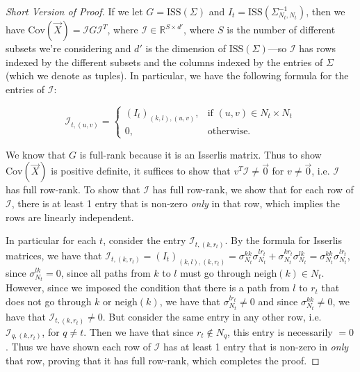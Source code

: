 \documentclass{article}
\theoremstyle{definition}
\newcommand{\ISS}{\text{ISS}}
\newcommand{\Cov}{\mathrm{Cov}}
\newcommand{\X}{\vec{X}}
\newcommand{\neigh}[1]{\text{neigh}(#1)}
\newcommand{\I}{\mathcal{I}}
\begin{document}
\begin{proof}[Short Version of Proof]
If we let $G = \ISS(\Sigma)$ and $I_t = \ISS(\Sigma_{N_t, N_t}^{-1})$, then we have $\Cov(\X) = \I G \I^T$, where $\I \in \mathbb{R}^{S \times d'}$, where $S$ is the number of different subsets we're considering and $d'$ is the dimension of $\ISS(\Sigma)$---so $\I$ has rows indexed by the different subsets and the columns indexed by the entries of $\Sigma$ (which we denote as tuples). In particular, we have the following formula for the entries of $\I$:

\begin{equation}
\I_{t, (u,v)} =
\begin{cases}
    (I_t)_{(k,l), (u,v)},& \text{if } (u,v) \in N_t \times N_t \\
    0,              & \text{otherwise.}
\end{cases}
\end{equation}


We know that $G$ is full-rank because it is an Isserlis matrix. Thus to show $\Cov(\X)$ is positive definite, it suffices to show that $v^T \I \neq \vec{0}$ for $v \neq \vec{0}$, i.e. $\I$ has full row-rank. To show that $\I$ has full row-rank, we show that for each row of $\I$, there is at least 1 entry that is non-zero \emph{only} in that row, which implies the rows are linearly independent. 

In particular for each $t$, consider the entry $\I_{t, (k, r_t)}$. By the formula for Isserlis matrices, we have that $\I_{t, (k,r_t)} = (I_t)_{(k,l), (k, r_t)} = \sigma_{N_t}^{kk}\sigma_{N_t}^{lr_t} + \sigma_{N_t}^{kr_t}\sigma_{N_t}^{lk} = \sigma_{N_t}^{kk}\sigma_{N_t}^{lr_t}$, since $\sigma_{N_t}^{lk} = 0$, since all paths from $k$ to $l$ must go through $\neigh{k} \in N_t$. However, since we imposed the condition that there is a path from $l$ to $r_t$ that does not go through $k$ or $\neigh{k}$, we have that $\sigma_{N_t}^{lr_t} \neq 0$ and since $\sigma_{N_t}^{kk} \neq 0$, we have that $\I_{t, (k, r_t)} \neq 0$. But consider the same entry in any other row, i.e. $\I_{q, (k, r_t)}$, for $q \neq t$. Then we have that since $r_t \not \in N_q$, this entry is necessarily $=0$. Thus we have shown each row of $\I$ has at least 1 entry that is non-zero in \emph{only} that row, proving that it has full row-rank, which completes the proof.


\end{proof}
\end{document}
